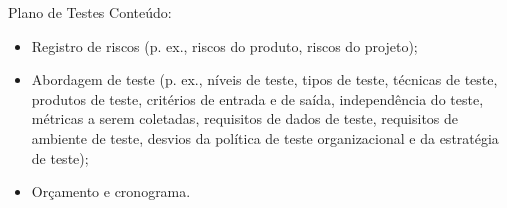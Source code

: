 
\begin{frame}{Plano de Testes}
        Conteúdo:
    \begin{itemize}
        \item Registro de riscos (p. ex., riscos do produto, riscos do projeto);
        \item Abordagem de teste (p. ex., níveis de teste, tipos de teste, técnicas de teste, produtos de teste, critérios de
entrada e de saída, independência do teste, métricas a serem coletadas, requisitos de dados de teste,
requisitos de ambiente de teste, desvios da política de teste organizacional e da estratégia de teste);
        \item Orçamento e cronograma. 
    \end{itemize}
\end{frame}
